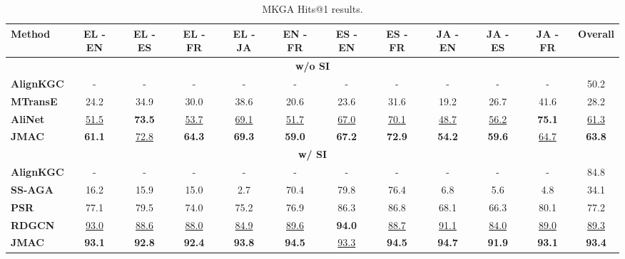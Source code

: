 \documentclass[11pt]{article}
\begin{document}
\begin{table*}[!t]
    \begin{adjustbox}{width=440pt,center}
    \centering
    \setlength{\tabcolsep}{0.3em}
    \begin{tabular}{l|c|c|c|c|c|c|c|c|c|c|c}
    \hline
    {\bf Method} & 
    \bf EL - EN & \bf EL - ES & \bf EL - FR & \bf EL - JA & \bf EN - FR & \bf ES - EN & \bf ES - FR & \bf JA - EN & \bf JA - ES & \bf JA - FR & \bf Overall \\
    \cline{2-12}
\hline
    \multicolumn{12}{c}{\textbf{w/o SI}} \\
    \hline
        \textbf{AlignKGC} & - & - & - & - & - & - & - & - & - & - & 50.2 \\
\bf MTransE & 24.2 & 34.9 & 30.0 & 38.6 & 20.6 & 23.6 & 31.6 & 19.2 & 26.7 & 41.6 & 28.2 \\
    \bf AliNet & \underline{51.5} & \textbf{73.5} & \underline{53.7} & \underline{69.1} & \underline{51.7} & \underline{67.0} & \underline{70.1} & \underline{48.7} & \underline{56.2} & \textbf{75.1} & \underline{61.3} \\
    \textbf{JMAC} & \textbf{61.1} & \underline{72.8} & \textbf{64.3} & \textbf{69.3} & \textbf{59.0} & \textbf{67.2} & \textbf{72.9} & \textbf{54.2} & \textbf{59.6} & \underline{64.7} & \textbf{63.8} \\
    \hline
    \multicolumn{12}{c}{\textbf{w/ SI}} \\
    \hline
    \textbf{AlignKGC} & - & - & - & - & - & - & - & - & - & - & 84.8 \\
    \bf SS-AGA & 16.2 & 15.9 & 15.0 & 2.7 & 70.4 & 79.8 & 76.4 & 6.8 & 5.6 & 4.8 & 34.1 \\
    \bf PSR & 77.1 & 79.5 & 74.0 & 75.2 & 76.9 & 86.3 & 86.8 & 68.1 & 66.3 & 80.1 & 77.2 \\
    \bf RDGCN & \underline{93.0} & \underline{88.6} & \underline{88.0} & \underline{84.9} & \underline{89.6} & \textbf{94.0} & \underline{88.7} & \underline{91.1} & \underline{84.0} & \underline{89.0} & \underline{89.3} \\
    \textbf{JMAC} & \bf 93.1 & \bf 92.8 & \bf 92.4 & \bf 93.8 & \bf 94.5 & \underline{93.3} & \bf 94.5 & \bf 94.7 & \bf 91.9 & \bf 93.1 & \bf 93.4 \\
    \hline 
\end{tabular}
    \end{adjustbox}
    \caption{MKGA Hits@1 results.}
    \label{tab:end2end_kga_detail}
\end{table*}
\end{document}
